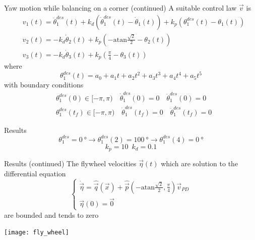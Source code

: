 \begin{frame}{Yaw motion while balancing on a corner (continued)}
  A suitable control law $\vec{v}$ is
  {\small
    \[
    \begin{split}
      &v_1(t) = \ddot{\theta}_1^{des}(t) + k_d(\dot{\theta}_1^{des}(t) - \dot{\theta}_1(t)) + k_p (\theta_1^{des}(t) - \theta_1(t))\\
      &v_2(t) = - k_d\dot{\theta}_2(t) + k_p \left(-\mathrm{atan}\frac{\sqrt{2}}{2} - \theta_2(t)\right)\\
      &v_3(t) = - k_d\dot{\theta}_3(t) + k_p \left(\frac{\pi}{4} - \theta_3(t)\right)
    \end{split}
    \]
  }
  where
  \[
  \theta_1^{des}(t) = a_0 + a_1 t + a_2 t^2 + a_3 t^3 + a_4 t^4 + a_5 t^5
  \]
  with boundary conditions
  \[
  \begin{split}
    &\theta_1^{des}(0) \in [-\pi, \pi) \quad \dot{\theta}_1^{des}(0)= 0 \quad \ddot{\theta}_1^{des}(0) = 0\\
      &\theta_1^{des}(t_{f}) \in [-\pi, \pi)  \quad \dot{\theta}_1^{des}(t_{f})= 0 \quad \ddot{\theta}_1^{des}(t_{f}) = 0
  \end{split}
  \]
\end{frame}

\begin{frame}{Results}
  \[\theta_1^{des} = \SI{0}{\degree} \rightarrow \theta_1^{des}(2) = \SI{100}{\degree}
  \rightarrow \theta_1^{des}(4) = \SI{0}{\degree}\]
  \[k_p = 10 \enspace k_d = 0.1\]
  \begin{center}
  \end{center}
\end{frame}

\begin{frame}{Results (continued)}
  The flywheel velocities $\vec{\eta}(t)$ which are
  solution to the differential equation
  \[
  \begin{cases}
    \dot{\vec{\eta}} = \hat{\vec{q}}(\vec{x}) + \hat{\vec{p}}\left(-\mathrm{atan}\frac{\sqrt{2}}{2},\frac{\pi}{4}\right)\vec{v}_{PD}\\
    \vec{\eta}(0) = \vec{0}
  \end{cases}
  \]
  are bounded and tends to zero
  \par
  \centering
  \texttt{[image: fly\_wheel]}
\end{frame}

